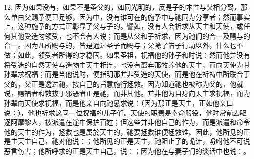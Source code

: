 12. 因为如果没有，如果不是圣父的，如同光明的，反是子的本性与父相分离，那么单由父赐予便已足够，因为中，没有谁可在的施予中与祂同为分享者；然而事实上，这种施予的方式正彰显了父与子的。譬如，没有人会祈求从天主和天使，或任何其他受造物领受，也不会有人说；而是从父和子祈求，因为祂们的合一及赐与的合一。因为凡所赐与的，皆是通过圣子而赐与；父除了借子行动以外，什么也不做；如此，领受者所得的才稳固。如果圣祖，祝福他的孙子和时说：然而他并没有将受造的自然天使与造物主天主相连，也没有离弃那牧养他的天主，而向天使为其孙辈求祝福；而是当他说时，便指明那并非受造的天使，而是他在祈祷中所联合于父的，父正是透过祂，按自己的旨意施行拯救。因为知道祂也被称为父的，他就说，赐福者和救拔于邪恶者正是祂，而非其他。并非他为自身向天主求祝福，而为孙辈向天使求祝福，而是他亲自向祂恳求说：（因为那正是天主，正如他亲口说：），他也祈求这同一位祝福的儿子们。天使的职责是奉命服役，他时常前去驱逐阿摩黎人，被派遣在途中保护百姓；但这些并非他自己的作为，而是派遣和命令他的天主的作为，拯救也是属於天主的，祂要拯救谁便拯救谁。因此，他所见的正是主天主自己，祂对他说：；他所见的正是天主，祂阻止了的诡计，吩咐他不可说恶言伤害；他所呼求的正是天主自己，说：；因为他在与妻子们的谈话中也说：。\par

